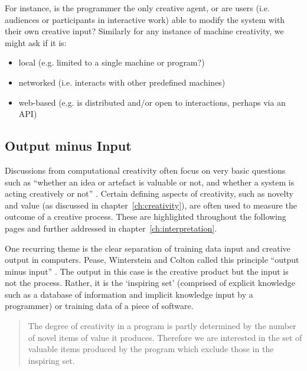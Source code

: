 For instance, is the programmer the only creative agent, or are users (i.e. audiences or participants in interactive work) able to modify the system with their own creative input? Similarly for any instance of machine creativity, we might ask if it is:

\begin{itemize}
  \item local (e.g. limited to a single machine or program?)
  \item networked (i.e. interacts with other predefined machines)
  \item web-based (e.g. is distributed and/or open to interactions, perhaps via an API)
\end{itemize}



\subsection{Output minus Input}

Discussions from computational creativity often focus on very basic questions such as ``whether an idea or artefact is valuable or not, and whether a system is acting creatively or not'' \autocite{Pease2011}. Certain defining aspects of creativity, such as novelty and value (as discussed in chapter~\ref{ch:creativity}), are often used to measure the outcome of a creative process. These are highlighted throughout the following pages and further addressed in chapter~\ref{ch:interpretation}.
 
One recurring theme is the clear separation of training data input and creative output in computers. Pease, Winterstein and Colton called this principle ``output minus input'' \citeyear[p.2]{Pease2001}. The output in this case is the creative product but the input is not the process. Rather, it is the `inspiring set' (comprised of explicit knowledge such as a database of information and implicit knowledge input by a programmer) or training data of a piece of software.

\begin{quotation}
  The degree of creativity in a program is partly determined by the number of novel items of value it produces. Therefore we are interested in the set of valuable items produced by the program which exclude those in the inspiring set. 
\end{quotation}

